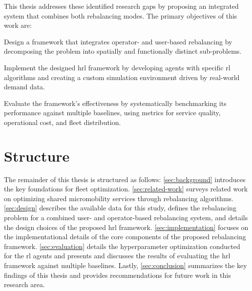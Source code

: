 This thesis addresses these identified research gaps by proposing an integrated system that combines both rebalancing modes.
The primary objectives of this work are:
\begin{goal}\label{goal:design}
    Design a  framework that integrates operator- and user-based rebalancing by decomposing the problem into spatially and functionally distinct sub-problems.
\end{goal}
\begin{goal}\label{goal:implementation}
    Implement the designed \gls{hrl} framework by developing agents with specific \gls{rl} algorithms and creating a custom simulation environment driven by real-world demand data.
\end{goal}
\begin{goal}\label{goal:evaluation}
    Evaluate the framework's effectiveness by systematically benchmarking its performance against multiple baselines, using metrics for service quality, operational cost, and fleet distribution.
\end{goal}



\section{Structure}\label{sec:introduction-structure}
The remainder of this thesis is structured as follows:
\autoref{sec:background} introduces the key foundations for fleet optimization.
\autoref{sec:related-work} surveys related work on optimizing shared micromobility services through rebalancing algorithms.
\autoref{sec:design} describes the available data for this study, defines the rebalancing problem for a combined user- and operator-based rebalancing system, and details the design choices of the proposed \gls{hrl} framework.
\autoref{sec:implementation} focuses on the implementational details of the core components of the proposed rebalancing framework.
\autoref{sec:evaluation} details the hyperparameter optimization conducted for the \gls{rl} agents and presents and discusses the results of evaluating the \gls{hrl} framework against multiple baselines.
Lastly, \autoref{sec:conclusion} summarizes the key findings of this thesis and provides recommendations for future work in this research area.